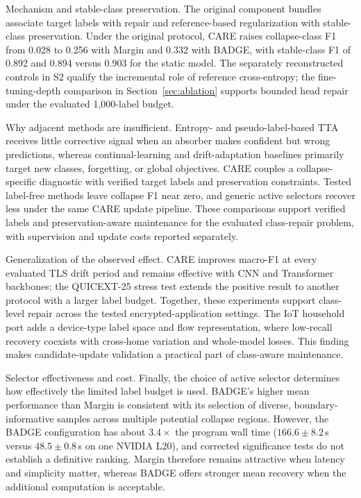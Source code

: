 \documentclass[journal]{IEEEtran}
\newcommand{\ours}{CARE}  %
\begin{document}
Mechanism and stable-class preservation.
The original component bundles associate target labels with repair and reference-based regularization with stable-class preservation. Under the original protocol, CARE raises collapse-class F1 from 0.028 to 0.256 with Margin and 0.332 with BADGE, with stable-class F1 of 0.892 and 0.894 versus 0.903 for the static model. The separately reconstructed controls in S2 qualify the incremental role of reference cross-entropy; the fine-tuning-depth comparison in Section~\ref{sec:ablation} supports bounded head repair under the evaluated 1{,}000-label budget.

Why adjacent methods are insufficient.
Entropy- and pseudo-label-based TTA receives little corrective signal when an absorber makes confident but wrong predictions, whereas continual-learning and drift-adaptation baselines primarily target new classes, forgetting, or global objectives. \ours{} couples a collapse-specific diagnostic with verified target labels and preservation constraints. Tested label-free methods leave collapse F1 near zero, and generic active selectors recover less under the same CARE update pipeline. These comparisons support verified labels and preservation-aware maintenance for the evaluated class-repair problem, with supervision and update costs reported separately.

Generalization of the observed effect.
\ours{} improves macro-F1 at every evaluated TLS drift period and remains effective with CNN and Transformer backbones; the QUICEXT-25 stress test extends the positive result to another protocol with a larger label budget. Together, these experiments support class-level repair across the tested encrypted-application settings. The IoT household port adds a device-type label space and flow representation, where low-recall recovery coexists with cross-home variation and whole-model losses. This finding makes candidate-update validation a practical part of class-aware maintenance.

Selector effectiveness and cost.
Finally, the choice of active selector determines how effectively the limited label budget is used. BADGE's higher mean performance than Margin is consistent with its selection of diverse, boundary-informative samples across multiple potential collapse regions. However, the BADGE configuration has about $3.4{\times}$ the program wall time ($166.6{\pm}8.2$\,s versus $48.5{\pm}0.8$\,s on one NVIDIA L20), and corrected significance tests do not establish a definitive ranking. Margin therefore remains attractive when latency and simplicity matter, whereas BADGE offers stronger mean recovery when the additional computation is acceptable.
\end{document}
